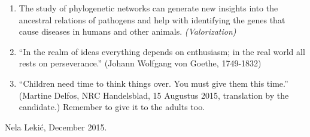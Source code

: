 \documentclass[a4paper,10pt]{article}
\begin{document}
\begin{enumerate}
  \item The study of phylogenetic networks can generate new insights into the ancestral relations of pathogens and help with identifying the genes that cause diseases in humans and other animals. \emph{(Valorization)}
  
  \item ``In the realm of ideas everything depends on enthusiasm; in the real world all rests on perseverance.'' (Johann Wolfgang von Goethe, 1749-1832) 
  
  \item ``Children need time to think things over. You must give them this time.'' (Martine Delfos, NRC Handelsblad, 15 Augustus 2015, translation by the candidate.) Remember to give it to the adults too.
  
\end{enumerate}

\begin{center}
Nela Leki\'c, December 2015.
\end{center}
\end{document}
